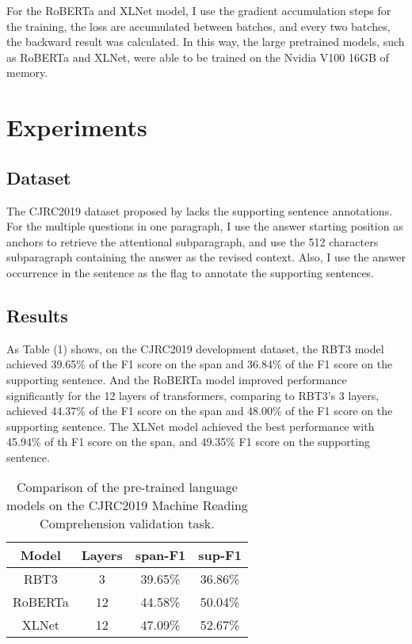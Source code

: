 \documentclass[11pt,a4paper]{article}
\begin{document}
For the RoBERTa and XLNet model, I use the gradient accumulation steps for the training, the loss are accumulated between batches,
and every two batches, the backward result was calculated.
In this way, the large pretrained models, such as RoBERTa and XLNet, were able to be trained on the Nvidia V100 16GB of memory.

\section{Experiments}

\subsection{Dataset}

 The CJRC2019 dataset proposed by \citet{duan2019cjrc} lacks the supporting sentence annotations.
For the multiple questions in one paragraph, I use the answer starting position as anchors to retrieve
the attentional subparagraph, and use the 512 characters subparagraph containing the answer as the revised context.
Also, I use the answer occurrence in the sentence as the flag to annotate the supporting sentences.

\subsection{Results}


As Table (1) shows, on the CJRC2019 development dataset, the RBT3 model achieved 39.65\% of the F1 score on the span and 36.84\% of the F1 score on the supporting sentence.
And the RoBERTa model improved performance significantly for the 12 layers of transformers, comparing to RBT3's 3 layers,
achieved 44.37\% of the F1 score on the span and 48.00\% of the F1 score on the supporting sentence.
The XLNet model achieved the best performance with 45.94\% of th F1 score on the span, and 49.35\% F1 score on the supporting sentence.


\begin{table}
\centering
\begin{tabular}{cccc}
\hline
\textbf{Model} & \textbf{Layers}& \textbf{span-F1} & \textbf{sup-F1} \\
\hline
RBT3 & 3 & 39.65\% & 36.86\% \\
RoBERTa & 12 & 44.58\% & 50.04\% \\
XLNet & 12 & 47.09\% & 52.67\% \\
\hline
\end{tabular}
\caption{Comparison of the pre-trained language models on the CJRC2019 Machine Reading Comprehension validation task.}
\end{table}
\end{document}
